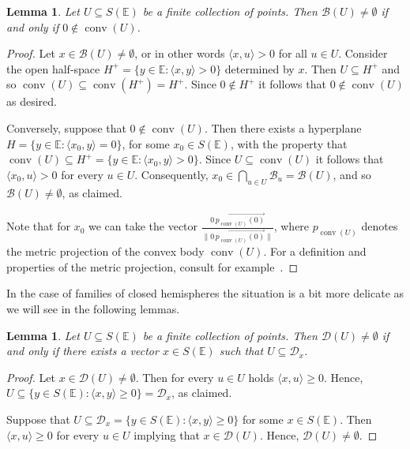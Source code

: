 \documentclass[a4paper,11pt,reqno, english]{amsart}
\newtheorem{lemma}[theorem]{Lemma}
\theoremstyle{definition}
\theoremstyle{remark}
\newcommand\E{\mathbb{E}}
\DeclareMathOperator{\conv}{\mathrm{conv}}
\begin{document}
\medskip
\begin{lemma}
	\label{lem : non-empty condition}
	Let $U\subseteq S(\E)$ be a finite collection of points.
	Then $\mathscr{B}(U)\neq\emptyset$ if and only if $0\notin\conv(U)$.
\end{lemma}
\begin{proof}
	Let $x\in \mathscr{B}(U)\neq\emptyset$, or in other words $\langle x,u\rangle >0$ for all $u\in U$.
	Consider the open half-space
	$
		H^+=\{ y\in \E : \langle x,y\rangle>0\}
	$
	determined by $x$.
	Then $U\subseteq H^+$ and so $\conv(U)\subseteq \conv(H^+)=H^+$.
	Since $0\notin H^+$ it follows that  $0\notin\conv(U)$ as desired.

	\medskip
	Conversely, suppose that $0\notin\conv(U)$.
	Then there exists a hyperplane $H=\{ y\in \E : \langle x_0,y\rangle=0\}$, for some $x_0\in S(\E)$, with the property that  $\conv(U)\subseteq H^+=\{ y\in \E : \langle x_0,y\rangle>0\}$.
	Since $U\subseteq \conv(U)$ it follows that $\langle x_0,u\rangle>0$ for every $u\in U$.
	Consequently, $x_0\in \bigcap_{u\in U}\mathscr{B}_u=\mathscr{B}(U)$, and so $\mathscr{B}(U)\neq\emptyset$, as claimed.

	Note that for $x_0$ we can take the vector $
		\frac{\overrightarrow{0\,p_{\conv(U)}(0)}}{\|\overrightarrow{0\,p_{\conv(U)}(0)}\|}$,
	where $p_{\conv(U)}$ denotes the metric projection of the convex body $\conv(U)$.
	For a definition and properties of the metric projection, consult for example~\cite[Sec.\,4.1]{Gruber2007}.
\end{proof}

\medskip
In the case of families of closed hemispheres the situation is a bit more delicate as we will see in the following lemmas.

\medskip
\begin{lemma}
	\label{lem : non-empty condition for closed}
	Let $U\subseteq S(\E)$ be a finite collection of points.
	Then $ \mathscr{D}(U)\neq\emptyset$ if and only if there exists a vector $x\in S(\E)$ such that $U\subseteq \mathscr{D}_x$.
\end{lemma}
\begin{proof}
	Let $x\in \mathscr{D}(U)\neq\emptyset$.
	Then for every $u\in U$ holds $\langle x,u\rangle\geq 0$.
	Hence, $U\subseteq \{ y\in S(\E) : \langle x, y\rangle\geq 0\}=\mathscr{D}_x$, as claimed.

	\medskip
	Suppose that $U\subseteq \mathscr{D}_x=\{ y\in S(\E) : \langle x, y\rangle\geq 0\}$ for some $x\in S(\E)$.
	Then $\langle x, u\rangle\geq 0$  for every $u\in U$ implying that $x\in \mathscr{D}(U)$.
	Hence, $\mathscr{D}(U)\neq\emptyset$.
\end{proof}
\end{document}
